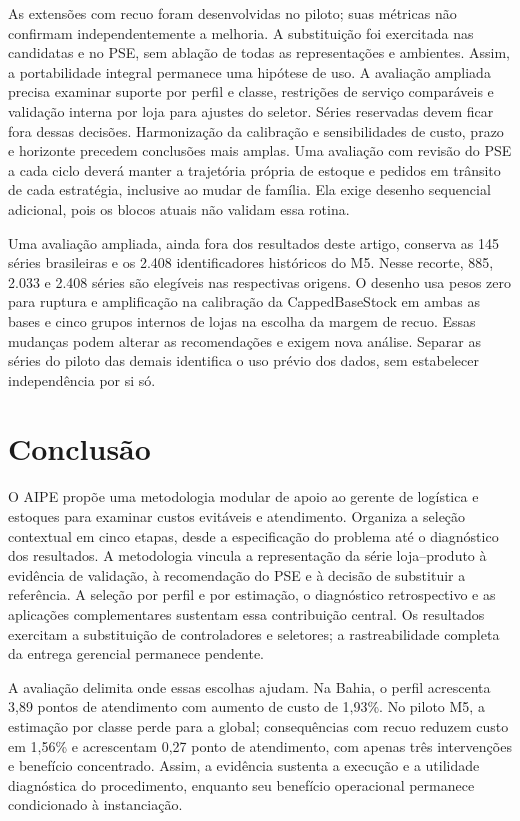 \documentclass[preprint,12pt]{elsarticle}
\begin{document}
As extensões com recuo foram desenvolvidas no piloto; suas métricas não confirmam independentemente a melhoria. A substituição foi exercitada nas candidatas e no PSE, sem ablação de todas as representações e ambientes. Assim, a portabilidade integral permanece uma hipótese de uso. A avaliação ampliada precisa examinar suporte por perfil e classe, restrições de serviço comparáveis e validação interna por loja para ajustes do seletor. Séries reservadas devem ficar fora dessas decisões. Harmonização da calibração e sensibilidades de custo, prazo e horizonte precedem conclusões mais amplas. Uma avaliação com revisão do PSE a cada ciclo deverá manter a trajetória própria de estoque e pedidos em trânsito de cada estratégia, inclusive ao mudar de família. Ela exige desenho sequencial adicional, pois os blocos atuais não validam essa rotina.

Uma avaliação ampliada, ainda fora dos resultados deste artigo, conserva as 145 séries brasileiras e os 2.408 identificadores históricos do M5. Nesse recorte, 885, 2.033 e 2.408 séries são elegíveis nas respectivas origens. O desenho usa pesos zero para ruptura e amplificação na calibração da CappedBaseStock em ambas as bases e cinco grupos internos de lojas na escolha da margem de recuo. Essas mudanças podem alterar as recomendações e exigem nova análise. Separar as séries do piloto das demais identifica o uso prévio dos dados, sem estabelecer independência por si só.

\section{Conclusão}
O AIPE propõe uma metodologia modular de apoio ao gerente de logística e estoques para examinar custos evitáveis e atendimento. Organiza a seleção contextual em cinco etapas, desde a especificação do problema até o diagnóstico dos resultados. A metodologia vincula a representação da série loja--produto à evidência de validação, à recomendação do PSE e à decisão de substituir a referência. A seleção por perfil e por estimação, o diagnóstico retrospectivo e as aplicações complementares sustentam essa contribuição central. Os resultados exercitam a substituição de controladores e seletores; a rastreabilidade completa da entrega gerencial permanece pendente.

A avaliação delimita onde essas escolhas ajudam. Na Bahia, o perfil acrescenta 3,89 pontos de atendimento com aumento de custo de 1,93\%. No piloto M5, a estimação por classe perde para a global; consequências com recuo reduzem custo em 1,56\% e acrescentam 0,27 ponto de atendimento, com apenas três intervenções e benefício concentrado. Assim, a evidência sustenta a execução e a utilidade diagnóstica do procedimento, enquanto seu benefício operacional permanece condicionado à instanciação.
\end{document}
